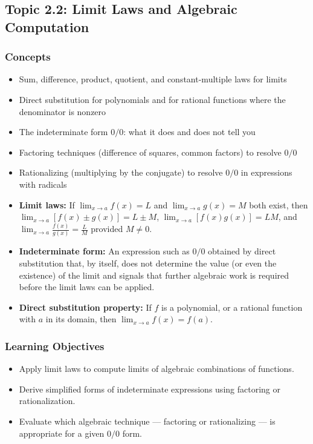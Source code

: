 \documentclass[11pt]{article}
\begin{document}
\subsection{Topic 2.2: Limit Laws and Algebraic Computation}

\subsubsection*{Concepts}
\begin{itemize}[leftmargin=*]
  \item Sum, difference, product, quotient, and constant-multiple laws for limits
  \item Direct substitution for polynomials and for rational functions where the denominator is nonzero
  \item The indeterminate form $0/0$: what it does and does not tell you
  \item Factoring techniques (difference of squares, common factors) to resolve $0/0$
  \item Rationalizing (multiplying by the conjugate) to resolve $0/0$ in expressions with radicals
\end{itemize}

\begin{keydefbox}
\begin{itemize}[leftmargin=*]
  \item \textbf{Limit laws:} If $\displaystyle\lim_{x\to a}f(x)=L$ and $\displaystyle\lim_{x\to a}g(x)=M$ both exist, then $\displaystyle\lim_{x\to a}[f(x)\pm g(x)]=L\pm M$, $\displaystyle\lim_{x\to a}[f(x)g(x)]=LM$, and $\displaystyle\lim_{x\to a}\frac{f(x)}{g(x)}=\frac{L}{M}$ provided $M\ne 0$.
  \item \textbf{Indeterminate form:} An expression such as $0/0$ obtained by direct substitution that, by itself, does not determine the value (or even the existence) of the limit and signals that further algebraic work is required before the limit laws can be applied.
  \item \textbf{Direct substitution property:} If $f$ is a polynomial, or a rational function with $a$ in its domain, then $\displaystyle\lim_{x\to a}f(x)=f(a)$.
\end{itemize}
\end{keydefbox}

\subsubsection*{Learning Objectives}
\begin{itemize}[leftmargin=*]
  \item Apply limit laws to compute limits of algebraic combinations of functions.
  \item Derive simplified forms of indeterminate expressions using factoring or rationalization.
  \item Evaluate which algebraic technique --- factoring or rationalizing --- is appropriate for a given $0/0$ form.
\end{itemize}
\end{document}
